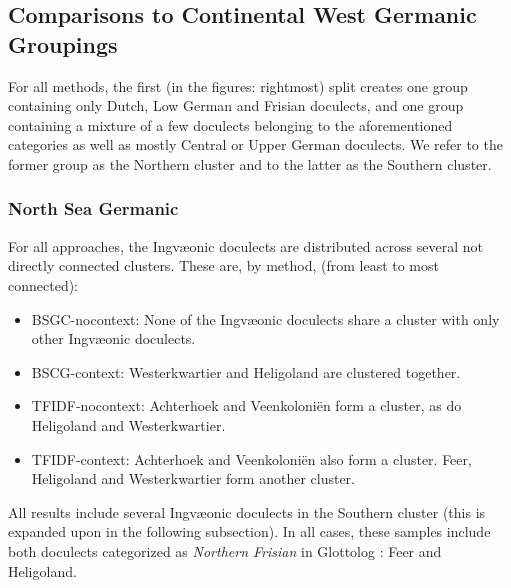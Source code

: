 \documentclass[a4paper]{article}
\begin{document}
\subsection{Comparisons to Continental West Germanic Groupings}

For all methods, the first (in the figures: rightmost) split
creates one group containing only Dutch, Low German and Frisian doculects,
and one group containing a mixture of 
a few doculects belonging to the aforementioned categories as well as
mostly Central or Upper German doculects.
We refer to the former group as the Northern cluster and to the
latter as the Southern cluster.

\FloatBarrier

\subsubsection{North Sea Germanic}

For all approaches, the Ingv\ae{}onic doculects
are distributed across several not directly connected clusters.
These are, by method, (from least to most connected):

\begin{itemize}
\item
BSGC-nocontext:
None of the Ingv\ae{}onic doculects share a cluster
with only other Ingv\ae{}onic doculects.

\item
BSCG-context:
Westerkwartier and Heligoland are clustered together.

\item
TFIDF-nocontext:
Achterhoek and Veenkoloni\"{e}n form a cluster,
as do Heligoland and Westerkwartier.

\item
TFIDF-context:
Achterhoek and Veenkoloni\"{e}n also form a cluster.
Feer, Heligoland and Westerkwartier form another cluster.
\end{itemize}

All results include several Ingv\ae{}onic doculects
in the Southern cluster (this is expanded upon in the following subsection).
In all cases, these
samples include both doculects categorized as \textit{Northern Frisian}
in Glottolog \citep{hammarstroem2018glottolog}: Feer and Heligoland.
\end{document}
